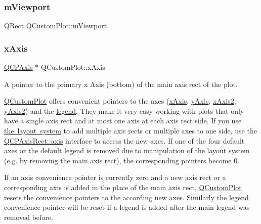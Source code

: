 \mbox{\label{class_q_custom_plot_ac0a7c38a715526c257cff95774f83ab6}} 
\subsubsection{\texorpdfstring{mViewport}{mViewport}}
{\footnotesize\ttfamily Q\+Rect Q\+Custom\+Plot\+::m\+Viewport\hspace{0.3cm}{\ttfamily [protected]}}

\mbox{\label{class_q_custom_plot_a9a79cd0158a4c7f30cbc702f0fd800e4}} 
\subsubsection{\texorpdfstring{xAxis}{xAxis}}
{\footnotesize\ttfamily \mbox{\hyperlink{class_q_c_p_axis}{Q\+C\+P\+Axis}} $\ast$ Q\+Custom\+Plot\+::x\+Axis}

A pointer to the primary x Axis (bottom) of the main axis rect of the plot.

\mbox{\hyperlink{class_q_custom_plot}{Q\+Custom\+Plot}} offers convenient pointers to the axes (\mbox{\hyperlink{class_q_custom_plot_a9a79cd0158a4c7f30cbc702f0fd800e4}{x\+Axis}}, \mbox{\hyperlink{class_q_custom_plot_af6fea5679725b152c14facd920b19367}{y\+Axis}}, \mbox{\hyperlink{class_q_custom_plot_ada41599f22cad901c030f3dcbdd82fd9}{x\+Axis2}}, \mbox{\hyperlink{class_q_custom_plot_af13fdc5bce7d0fabd640f13ba805c0b7}{y\+Axis2}}) and the \mbox{\hyperlink{class_q_custom_plot_a4eadcd237dc6a09938b68b16877fa6af}{legend}}. They make it very easy working with plots that only have a single axis rect and at most one axis at each axis rect side. If you use \mbox{\hyperlink{}{the layout system}} to add multiple axis rects or multiple axes to one side, use the \mbox{\hyperlink{class_q_c_p_axis_rect_a583ae4f6d78b601b732183f6cabecbe1}{Q\+C\+P\+Axis\+Rect\+::axis}} interface to access the new axes. If one of the four default axes or the default legend is removed due to manipulation of the layout system (e.\+g. by removing the main axis rect), the corresponding pointers become 0.

If an axis convenience pointer is currently zero and a new axis rect or a corresponding axis is added in the place of the main axis rect, \mbox{\hyperlink{class_q_custom_plot}{Q\+Custom\+Plot}} resets the convenience pointers to the according new axes. Similarly the \mbox{\hyperlink{class_q_custom_plot_a4eadcd237dc6a09938b68b16877fa6af}{legend}} convenience pointer will be reset if a legend is added after the main legend was removed before. \mbox{\label{class_q_custom_plot_ada41599f22cad901c030f3dcbdd82fd9}} 
